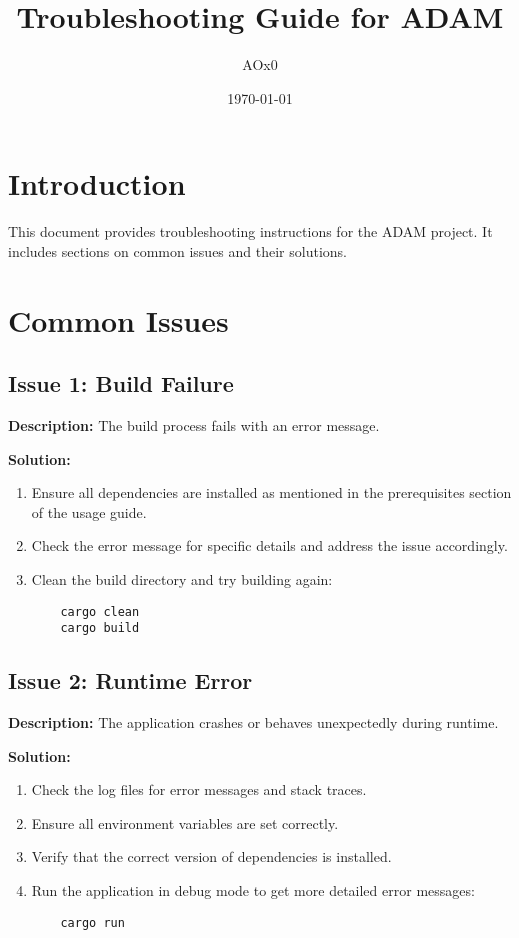 \documentclass{article}
\title{Troubleshooting Guide for ADAM}
\author{AOx0}
\date{\today}
\begin{document}
\maketitle

\section{Introduction}
This document provides troubleshooting instructions for the ADAM project. It includes sections on common issues and their solutions.

\section{Common Issues}
\subsection{Issue 1: Build Failure}
\textbf{Description:} The build process fails with an error message.

\textbf{Solution:}
\begin{enumerate}
    \item Ensure all dependencies are installed as mentioned in the prerequisites section of the usage guide.
    \item Check the error message for specific details and address the issue accordingly.
    \item Clean the build directory and try building again:
    \begin{verbatim}
    cargo clean
    cargo build
    \end{verbatim}
\end{enumerate}

\subsection{Issue 2: Runtime Error}
\textbf{Description:} The application crashes or behaves unexpectedly during runtime.

\textbf{Solution:}
\begin{enumerate}
    \item Check the log files for error messages and stack traces.
    \item Ensure all environment variables are set correctly.
    \item Verify that the correct version of dependencies is installed.
    \item Run the application in debug mode to get more detailed error messages:
    \begin{verbatim}
    cargo run
    \end{verbatim}
\end{enumerate}
\end{document}
